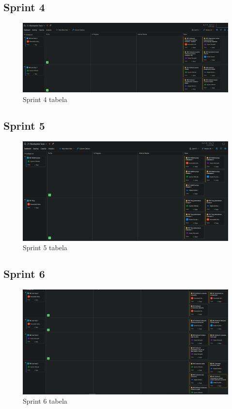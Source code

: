 \documentclass[10pt, a4paper]{report}
\begin{document}
\subsection{Sprint 4}
\begin{figure}[ht]
    \begin{center}
        \includegraphics[scale=0.38]{s4.png}
        \caption{Sprint 4 tabela}
    \end{center}
\end{figure}
\newpage

\subsection{Sprint 5}
\begin{figure}[ht]
    \begin{center}
        \includegraphics[scale=0.38]{s5.png}
        \caption{Sprint 5 tabela}
    \end{center}
\end{figure}
\newpage

\subsection{Sprint 6}
\begin{figure}[ht]
    \begin{center}
        \includegraphics[scale=0.36]{s6.png}
        \caption{Sprint 6 tabela}
    \end{center}
\end{figure}
\end{document}
